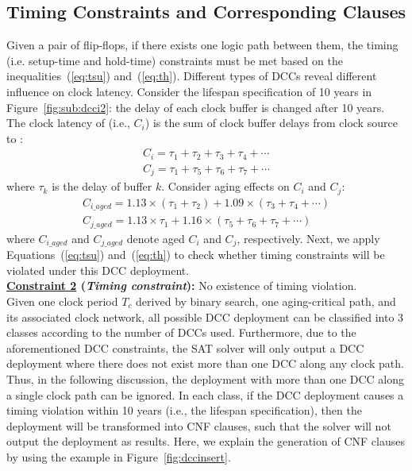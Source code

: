 \subsection{Timing Constraints and Corresponding Clauses}
\label{subsec:tccc}
Given a pair of flip-flops, if there exists one logic path between them, the timing (i.e. setup-time and hold-time) constraints must be met based on the inequalities~(\ref{eq:tsu}) and~(\ref{eq:th}). Different types of DCCs reveal different influence on clock latency. Consider the lifespan specification of 10 years in Figure~\ref{fig:sub:dcci2}: the delay of each clock buffer is changed after 10 years. The clock latency of  (i.e., $C_i$) is the sum of clock buffer delays from clock source to : 
\begin{gather*}
C_i = \tau_1 + \tau_2 + \tau_3 + \tau_4 +\dotsb \\
C_j = \tau_1 + \tau_5 + \tau_6 + \tau_7 +\dotsb
\end{gather*}
where $\tau_k$ is the delay of buffer $k$. Consider aging effects on $C_i$ and $C_j$: 
\begin{gather*}
C_{i\_aged} = 1.13 \times \left(\tau_1 + \tau_2\right) + 1.09 \times \left(\tau_3 + \tau_4 + \dotsb\right)\\
C_{j\_aged} = 1.13 \times \tau_1+ 1.16 \times \left( \tau_5 + \tau_6 + \tau_7 + \dotsb \right)
\end{gather*}
where $C_{i\_aged}$ and $C_{j\_aged}$ denote aged $C_i$ and $C_j$, respectively. Next, we apply Equations~(\ref{eq:tsu}) and~(\ref{eq:th}) to check whether timing constraints will be violated under this DCC deployment.\\

\noindent \textbf{\uline{Constraint 2} (\textit{Timing constraint}):} No existence of timing violation.\\

Given one clock period $T_c$ derived by binary search, one aging-critical path, and its associated clock network, all possible DCC deployment can be classified into 3 classes according to the number of DCCs used. Furthermore, due to the aforementioned DCC constraints, the SAT solver will only output a DCC deployment where there does not exist more than one DCC along any clock path. Thus, in the following discussion, the deployment with more than one DCC along a single clock path can be ignored. In each class, if the DCC deployment causes a timing violation within 10 years (i.e., the lifespan specification), then the deployment will be transformed into CNF clauses, such that the solver will not output the deployment as results. Here, we explain the generation of CNF clauses by using the example in Figure~\ref{fig:dccinsert}.\\


